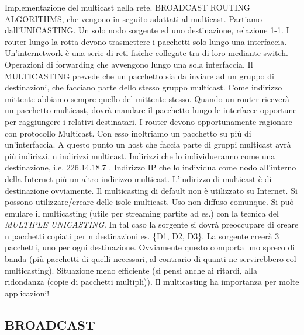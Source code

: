 Implementazione del multicast nella rete. BROADCAST ROUTING ALGORITHMS, che vengono in seguito adattati al multicast. Partiamo dall'UNICASTING. Un solo nodo sorgente ed uno destinazione, relazione 1-1. I router lungo la rotta devono trasmettere i pacchetti solo lungo una interfaccia. Un'internetwork è una serie di reti fisiche collegate tra di loro mediante switch. Operazioni di forwarding che avvengono lungo una sola interfaccia. Il MULTICASTING prevede che un pacchetto sia da inviare ad un gruppo di destinazioni, che facciano parte dello stesso gruppo multicast. Come indirizzo mittente abbiamo sempre quello del mittente stesso. Quando un router riceverà un pacchetto multicast, dovrà mandare il pacchetto lungo le interfacce opportune per raggiungere i relativi destinatari. I router devono opportunamente ragionare con protocollo Multicast. Con esso inoltriamo un pacchetto su più di un'interfaccia. A questo punto un host che faccia parte di gruppi multicast avrà più indirizzi. n indirizzi multicast. Indirizzi che lo individueranno come una destinazione, i.e. 226.14.18.7 . Indirizzo IP che lo individua come nodo all'interno della Internet più un altro indirizzo multicast. L'indirizzo di multicast è di destinazione ovviamente. Il multicasting di default non è utilizzato su Internet. Si possono utilizzare/creare delle isole multicast. Uso non diffuso comunque. Si può emulare il multicasting (utile per streaming partite ad es.) con la tecnica del \textit{MULTIPLE UNICASTING}. In tal caso la sorgente si dovrà preoccupare di creare n pacchetti copiati per n destinazioni es. \{D1, D2, D3\}. La sorgente creerà 3 pacchetti, uno per ogni destinazione. Ovviamente questo comporta uno spreco di banda (più pacchetti di quelli necessari, al contrario di quanti ne servirebbero col multicasting). Situazione meno efficiente (si pensi anche ai ritardi, alla ridondanza (copie di pacchetti multipli)). Il multicasting ha importanza per molte applicazioni!

\subsection{BROADCAST}

